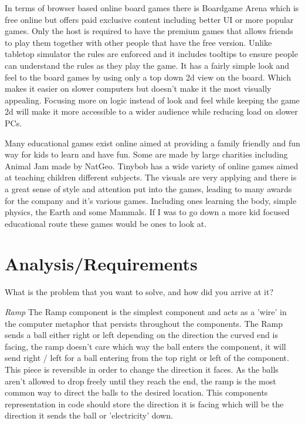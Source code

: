 \documentclass{l4proj}
\begin{document}
In terms of browser based online board games there is Boardgame Arena which is free online but offers paid exclusive content including better UI or more popular
games. Only the host is required to have the premium games that allows friends to play them together with other people that have the free version. Unlike tabletop simulator
the rules are enforced and it includes tooltips to ensure people can understand the rules as they play the game. It has a fairly simple look and feel to the board games
by using only a top down 2d view on the board. Which makes it easier on slower computers but doesn't make it the most visually appealing. 
Focusing more on logic instead of look and feel while keeping the game 2d will make it more accessible to a wider audience while reducing load on slower PCs.

Many educational games exist online aimed at providing a family friendly and fun way for kids to learn and have fun. Some are made by large charities including Animal Jam made by NatGeo. 
Tinybob has a wide variety of online games aimed at teaching children different subjects. The visuals are very applying and there is a great sense of style and attention put into the games, leading to many awards for the company 
and it's various games. Including ones learning the body, simple physics, the Earth and some Mammals. If I was to go down a more kid focused educational route
these games would be ones to look at.

\chapter{Analysis/Requirements}
What is the problem that you want to solve, and how did you arrive at it?


\emph{Ramp} 
The Ramp component is the simplest component and acts as a 'wire' in the computer metaphor that persists throughout the components. 
The Ramp sends a ball either right or left depending on the direction the curved end is facing, the ramp doesn't care which way the ball enters
the component, it will send right / left for a ball entering from the top right or left of the component. This piece is reversible in order to change the direction
it faces. As the balls aren't allowed to drop freely until they reach the end, the ramp is the most common way to direct the balls to the desired location.
This components representation in code should store the direction it is facing which will be the direction it sends the ball or 'electricity' down.
\end{document}

